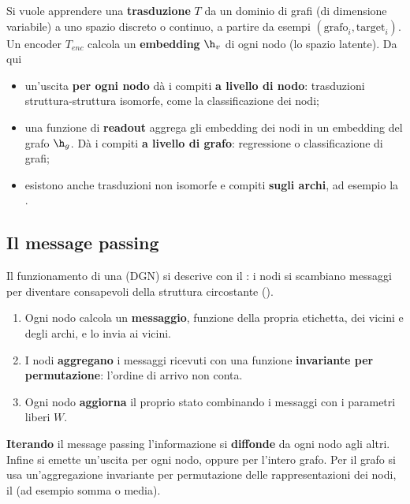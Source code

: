 Si vuole apprendere una \textbf{trasduzione} $T$ da un dominio di grafi (di dimensione variabile) a uno spazio
discreto o continuo, a partire da esempi $(\text{grafo}_i,\text{target}_i)$. Un encoder $T_{\mathit{enc}}$ calcola un
\textbf{embedding} $\h_v$ di ogni nodo (lo spazio latente). Da qui
\begin{itemize}
  \item un'uscita \textbf{per ogni nodo} dà i compiti \textbf{a livello di nodo}: trasduzioni struttura-struttura
        isomorfe, come la classificazione dei nodi;
  \item una funzione di \textbf{readout} aggrega gli embedding dei nodi in un embedding del grafo $\h_g$. Dà i
        compiti \textbf{a livello di grafo}: regressione o classificazione di grafi;
  \item esistono anche trasduzioni non isomorfe e compiti \textbf{sugli archi}, ad esempio la .
\end{itemize}

\subsection{Il message passing}

Il funzionamento di una  (DGN) si descrive con il : i nodi si
scambiano messaggi per diventare consapevoli della struttura circostante ().
\begin{enumerate}
  \item Ogni nodo calcola un \textbf{messaggio}, funzione della propria etichetta, dei vicini e degli archi, e lo
        invia ai vicini.
  \item I nodi \textbf{aggregano} i messaggi ricevuti con una funzione \textbf{invariante per permutazione}: l'ordine
        di arrivo non conta.
  \item Ogni nodo \textbf{aggiorna} il proprio stato combinando i messaggi con i parametri liberi $W$.
\end{enumerate}
\textbf{Iterando} il message passing l'informazione si \textbf{diffonde} da ogni nodo agli altri. Infine si emette
un'uscita per ogni nodo, oppure per l'intero grafo. Per il grafo si usa un'aggregazione invariante per
permutazione delle rappresentazioni dei nodi, il  (ad esempio somma o media).

